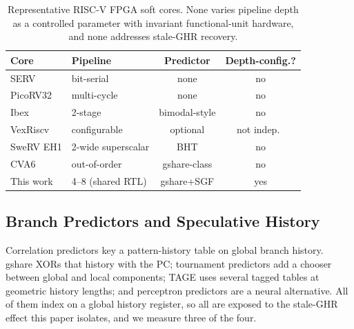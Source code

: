 \documentclass[acmsmall,nonacm,screen]{acmart}
\begin{document}
\begin{table}[t]
\centering
\caption{Representative RISC-V FPGA soft cores. None varies pipeline depth as a controlled parameter with invariant functional-unit hardware, and none addresses stale-GHR recovery.}
\label{tab:cores}
\small
\begin{tabular}{@{}llcc@{}}
\toprule
\textbf{Core} & \textbf{Pipeline} & \textbf{Predictor} & \textbf{Depth-config.?} \\
\midrule
SERV \cite{serv2019}          & bit-serial        & none          & no \\
PicoRV32 \cite{picorv32}      & multi-cycle       & none          & no \\
Ibex \cite{schiavone2017slow} & 2-stage           & bimodal-style  & no \\
VexRiscv \cite{vexriscv}      & configurable      & optional       & not indep.\ \\
SweRV EH1 \cite{swerv2019}    & 2-wide superscalar & BHT           & no \\
CVA6 \cite{zaruba2019ariane}  & out-of-order      & gshare-class   & no \\
\midrule
This work                     & 4--8 (shared RTL) & gshare+SGF     & yes \\
\bottomrule
\end{tabular}
\end{table}

\subsection{Branch Predictors and Speculative History}

Correlation predictors key a pattern-history table on global branch history. gshare \cite{mcfarling1993combining} XORs that history with the PC; tournament predictors add a chooser between global and local components; TAGE \cite{seznec2011tage} uses several tagged tables at geometric history lengths; and perceptron predictors \cite{jimenez2001dynamic} are a neural alternative. All of them index on a global history register, so all are exposed to the stale-GHR effect this paper isolates, and we measure three of the four.
\end{document}
